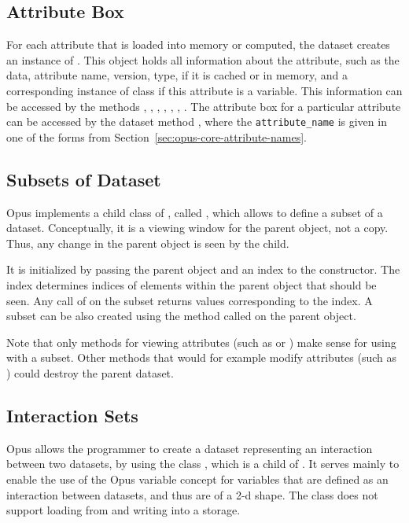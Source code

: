 \subsection{Attribute Box}
\label{sec:attribute-box}
%
For each attribute that is loaded into memory or computed, the dataset creates
an instance of . This object holds all information
about the attribute, such as the data, attribute name, 
version, type, if it is cached or in memory, and a corresponding
instance of class  if this attribute is a variable. This
information can be accessed by the  methods
, , ,
, , ,
. The attribute box for a particular attribute
can be accessed by the dataset method
, where the \verb|attribute_name| is
given in one of the  forms from Section~\ref{sec:opus-core-attribute-names}.

\subsection{Subsets of Dataset}
%
Opus implements a child class of , 
called ,
which allows to define a subset of a dataset.  Conceptually, it is a viewing
window for the parent  object, not a copy. Thus, any change in
the parent object is seen by the child.

It is initialized by passing the parent object and an index to the
constructor.  The index determines indices of elements within the parent
object that should be seen. Any call of  on the subset returns
values corresponding to the index.
A subset can be also created using the  method 
called on the parent object. 

Note that only methods for viewing attributes (such as  or ) make sense
for using with a subset. Other
methods that would for example modify attributes (such as ) could destroy the parent dataset.

\subsection{Interaction Sets}
\label{sec:interaction-set}
%
Opus allows the programmer to create a dataset representing
an interaction between two datasets, by using the class
, which is a child of . It serves mainly
to enable the use of the Opus variable concept for variables
that are defined as an interaction between datasets, and thus are of a 2-d
shape. The class does not support loading from and writing into a storage.

